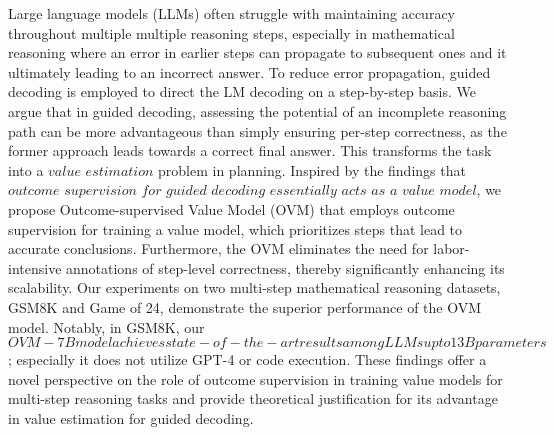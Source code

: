Large language models (LLMs) often struggle with maintaining accuracy throughout multiple multiple reasoning steps, especially in mathematical reasoning where an error in earlier steps can propagate to subsequent ones and it ultimately leading to an incorrect answer. To reduce error propagation, guided decoding is employed to direct the LM decoding on a step-by-step basis. We argue that in guided decoding, assessing the potential of an incomplete reasoning path can be more advantageous than simply ensuring per-step correctness, as the former approach leads towards a correct final answer. This transforms the task into a $\textit{value estimation}$ problem in planning. Inspired by the findings that $\textit{outcome supervision for guided decoding essentially acts as a value model}$, we propose Outcome-supervised Value Model (OVM) that employs outcome supervision for training a value model, which prioritizes steps that lead to accurate conclusions. Furthermore, the OVM eliminates the need for labor-intensive annotations of step-level correctness, thereby significantly enhancing its scalability. Our experiments on two multi-step mathematical reasoning datasets, GSM8K and Game of 24, demonstrate the superior performance of the OVM model. Notably, in GSM8K, our ${OVM-7B model achieves state-of-the-art results among LLMs up to  13B parameters}$; especially it does not utilize GPT-4 or code execution. These findings offer a novel perspective on the role of outcome supervision in training value models for multi-step reasoning tasks and provide theoretical justification for its advantage in value estimation for guided decoding.